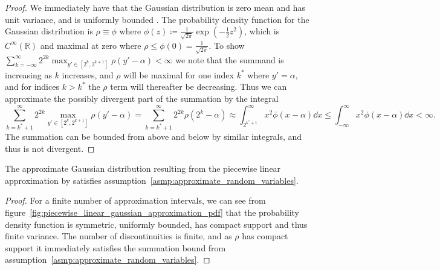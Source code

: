 \documentclass[manuscript,review]{acmart}
\begin{document}
\begin{proof}
We immediately have that the Gaussian distribution is zero mean and has unit variance, and is uniformly bounded \citep[appendix~C.2]{blundell2014concepts}. The probability density function for the Gaussian distribution is $ \rho \equiv \phi $ where $ \phi(z) \coloneqq \tfrac{1}{\sqrt{2\pi}} {\exp}(-\tfrac{1}{2}z^2) $, which is $ C^\infty(\mathbb{R}) $ and maximal at zero where $ \rho \leq \phi(0) = \tfrac{1}{\sqrt{2\pi}} $. To show $ \sum_{k=-\infty}^\infty 2^{2k} \max_{y'\in[2^{k}, 2^{k+1}]} \rho(y'-\alpha) < \infty $ we note that the summand is increasing as $ k $ increases, and $ \rho $ will be maximal for one index $ k^* $ where $ y' = \alpha $, and for indices $ k > k^* $ the $ \rho $ term will thereafter be decreasing. Thus we can approximate the possibly divergent part of the summation by the integral 
\begin{equation*}
\sum_{k=k^* + 1}^\infty 2^{2k} \max_{y'\in[2^{k}, 2^{k+1}]} \rho(y'-\alpha) = \sum_{k=k^* + 1}^\infty 2^{2k}  \rho(2^k-\alpha)
\approx \int_{2^{k^* + 1}}^\infty  x^2  \phi(x-\alpha) \dd{x}
\leq \int_{-\infty}^\infty  x^2  \phi(x-\alpha) \dd{x} < \infty.
\end{equation*}
The summation can be bounded from above and below by similar integrals, and thus is not divergent. 
\qedhere
\end{proof}

\begin{lemma}
\label{lemma:approximate_gaussian_distribution}
The approximate Gaussian distribution resulting from the piecewise linear approximation by \citet{giles2020approximating} satisfies assumption~\ref{asmp:approximate_random_variables}.
\end{lemma}

\begin{proof}
For a finite number of approximation intervals, we can see from figure~\ref{fig:piecewise_linear_gaussian_approximation_pdf} that the probability density function is symmetric, uniformly bounded, has compact support and thus finite variance. The number of discontinuities is finite, and as $ \rho $ has compact support it immediately satisfies the summation bound from assumption~\ref{asmp:approximate_random_variables}.
\end{proof}
\end{document}
